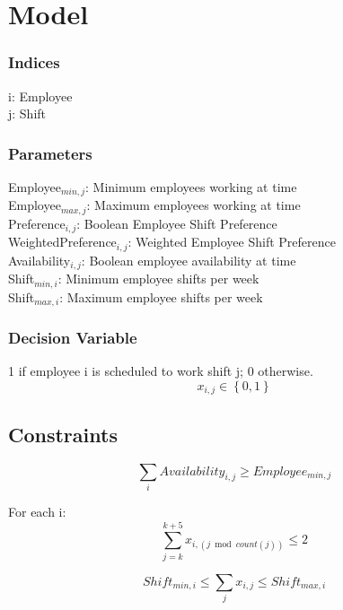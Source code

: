                   \chapter{Model}

\subsection{Indices}
i: Employee\\
j: Shift\\

\subsection{Parameters}
Employee$_{min,j}$: Minimum employees working at time\\
Employee$_{max,j}$: Maximum employees working at time\\
Preference$_{i,j}$: Boolean Employee Shift Preference\\
WeightedPreference$_{i,j}$: Weighted Employee Shift Preference\\
Availability$_{i,j}$: Boolean employee availability at time\\
Shift$_{min,i}$: Minimum employee shifts per week\\
Shift$_{max,i}$: Maximum employee shifts per week

\subsection{Decision Variable}
1 if employee i is scheduled to work shift j; 0 otherwise.
$$x_{i,j} \in \left\{ { 0 , 1 }\right\} $$

\section{Constraints}


$$\begin{equation}\label{availability} \sum\limits_{i} Availability_{i,j} \ge Employee_{min,j} \end{equation}

$$

 For each i: \\
$$ \begin{equation}\label{daylimit}\sum\limits_{j = k}^{k+5} x_{i,( j\bmod{count(j)})} \le 2 \end{equation} $$

$$ \begin{equation}\label{employeeshifts} Shift_{min,i}\le \sum\limits_{j}x_{i,j} \le Shift_{max,i} \end{equation}$$


